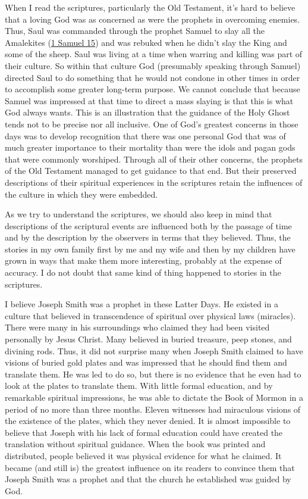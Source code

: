 			When I read the scriptures, particularly the Old Testament, it's hard to believe that a loving God was as concerned as were the prophets in overcoming enemies. Thus, Saul was commanded through the prophet Samuel to slay all the Amalekites (\hyperref[1SAMUEL-15]{1 Samuel 15}) and was rebuked when he didn't slay the King and some of the sheep. Saul was living at a time when warring and killing was part of their culture. So within that culture God (presumably speaking through Samuel) directed Saul to do something that he would not condone in other times in order to accomplish some greater long-term purpose. We cannot conclude that because Samuel was impressed at that time to direct a mass slaying is that this is what God always wants. This is an illustration that the guidance of the Holy Ghost tends not to be precise nor all inclusive. One of God's greatest concerns in those days was to develop recognition that there was one personal God that was of much greater importance to their mortality than were the idols and pagan gods that were commonly worshiped. Through all of their other concerns, the prophets of the Old Testament managed to get guidance to that end. But their preserved descriptions of their spiritual experiences in the scriptures retain the influences of the culture in which they were embedded.

			As we try to understand the scriptures, we should also keep in mind that descriptions of the scriptural events are influenced both by the passage of time and by the description by the observers in terms that they believed. Thus, the stories in my own family first by me and my wife and then by my children have grown in ways that make them more interesting, probably at the expense of accuracy. I do not doubt that same kind of thing happened to stories in the scriptures.

			I believe Joseph Smith was a prophet in these Latter Days. He existed in a culture that believed in transcendence of spiritual over physical laws (miracles). There were many in his surroundings who claimed they had been visited personally by Jesus Christ. Many believed in buried treasure, peep stones, and divining rods. Thus, it did not surprise many when Joseph Smith claimed to have visions of buried gold plates and was impressed that he should find them and translate them. He was led to do so, but there is no evidence that he even had to look at the plates to translate them. With little formal education, and by remarkable spiritual impressions, he was able to dictate the Book of Mormon in a period of no more than three months. Eleven witnesses had miraculous visions of the existence of the plates, which they never denied. It is almost impossible to believe that Joseph with his lack of formal education could have created the translation without spiritual guidance. When the book was printed and distributed, people believed it was physical evidence for what he claimed. It became (and still is) the greatest influence on its readers to convince them that Joseph Smith was a prophet and that the church he established was guided by God.

